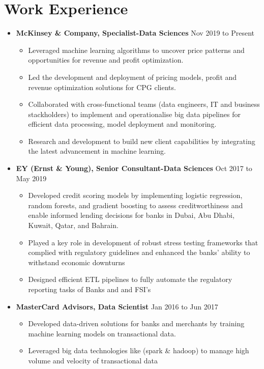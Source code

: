 \documentclass[a4paper,10pt]{article}
\begin{document}
\section*{Work Experience}
\begin{itemize}[leftmargin=0.2cm, label={}]
    \item \textbf{McKinsey \& Company, Specialist-Data Sciences} \hfill \textnormal{Nov 2019 to Present}
    \begin{itemize}[leftmargin=0.5cm, label={\textbullet}]
        \item Leveraged machine learning algorithms to uncover price patterns and opportunities for revenue and profit optimization.
        \item Led the development and deployment of pricing models, profit and revenue optimization solutions for CPG clients.
        \item Collaborated with cross-functional teams (data engineers, IT and business stackholders) to implement and operationalise big data pipelines for efficient data processing, model deployment and monitoring.
        \item Research and development to build new client capabilities by integrating the latest advancement in machine learning. 
    \end{itemize}
    
    \item \textbf{EY (Ernst \& Young), Senior Consultant-Data Sciences} \hfill \textnormal{Oct 2017 to May 2019}
    \begin{itemize}[leftmargin=0.5cm, label={\textbullet}]
        \item Developed credit scoring models by implementing logistic regression, random forests, and gradient boosting to assess creditworthiness and enable informed lending decisions for banks in Dubai, Abu Dhabi, Kuwait, Qatar, and Bahrain.
        \item Played a key role in development of robust stress testing frameworks that complied with regulatory guidelines and enhanced the banks' ability to withstand economic downturns
        \item Designed efficient ETL pipelines to fully automate the regulatory reporting tasks of Banks and and FSI's
    \end{itemize}
    
    \item \textbf{MasterCard Advisors, Data Scientist} \hfill \textnormal{Jan 2016 to Jun 2017}
    \begin{itemize}[leftmargin=0.5cm, label={\textbullet}]
        \item Developed data-driven solutions for banks and merchants by training machine learning models on transactional data.
        \item Leveraged big data technologies like (spark \& hadoop) to manage high volume and velocity of transactional data
    \end{itemize}
    

\end{itemize}
\end{document}
